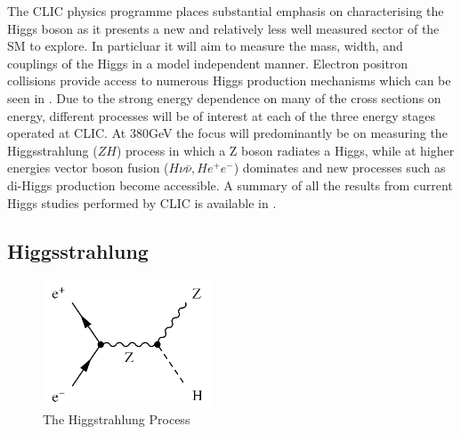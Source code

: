 The CLIC physics programme places substantial emphasis on characterising the Higgs boson as it presents a new and relatively less well measured sector of the \ac{SM} to explore. In particluar it will aim to measure the mass, width, and couplings of the Higgs in a model independent manner. Electron positron collisions provide access to numerous Higgs production mechanisms which can be seen in . Due to the strong energy dependence on many of the cross sections on energy, different processes will be of interest at each of the three energy stages operated at CLIC. At 380GeV the focus will predominantly be on measuring the Higgsstrahlung ($ZH$) process in which a Z boson radiates a Higgs, while at higher energies vector boson fusion ($H\nu\bar{\nu},He^{+}e^{-}$) dominates and new processes such as di-Higgs production become accessible. A summary of all the results from current Higgs studies performed by CLIC is available in \cite{Abramowicz:2016zbo}.

\subsection{Higgsstrahlung}

\begin{figure}
  \centering
  \includegraphics[width=0.45\textwidth,keepaspectratio]{Theory/fig/HiggsStrahlung.png}
  \caption[The Higgstrahlung Process]{The Higgstrahlung Process}
  \label{fig:higgsstrahlung}
\end{figure}


